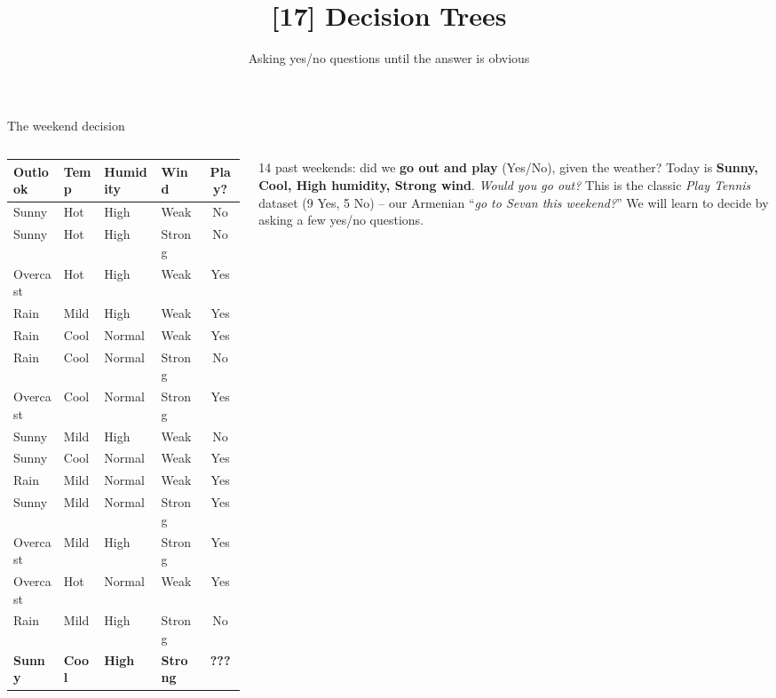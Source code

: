 \documentclass[aspectratio=169]{beamer}
\title{[17] Decision Trees}
\subtitle{Asking yes/no questions until the answer is obvious}
\date{}
\begin{document}
\begin{frame}{The weekend decision}
  \begin{columns}[T]
    \scriptsize
    \setlength{\tabcolsep}{4pt}\renewcommand{\arraystretch}{1.02}
    \begin{tabular}{l l l l | c}
      \textbf{Outlook} & \textbf{Temp} & \textbf{Humidity} & \textbf{Wind} & \textbf{Play?} \\
      \hline
      Sunny & Hot & High & Weak & \textcolor{armred}{No} \\
      Sunny & Hot & High & Strong & \textcolor{armred}{No} \\
      Overcast & Hot & High & Weak & \textcolor{paramgreen}{Yes} \\
      Rain & Mild & High & Weak & \textcolor{paramgreen}{Yes} \\
      Rain & Cool & Normal & Weak & \textcolor{paramgreen}{Yes} \\
      Rain & Cool & Normal & Strong & \textcolor{armred}{No} \\
      Overcast & Cool & Normal & Strong & \textcolor{paramgreen}{Yes} \\
      Sunny & Mild & High & Weak & \textcolor{armred}{No} \\
      Sunny & Cool & Normal & Weak & \textcolor{paramgreen}{Yes} \\
      Rain & Mild & Normal & Weak & \textcolor{paramgreen}{Yes} \\
      Sunny & Mild & Normal & Strong & \textcolor{paramgreen}{Yes} \\
      Overcast & Mild & High & Strong & \textcolor{paramgreen}{Yes} \\
      Overcast & Hot & Normal & Weak & \textcolor{paramgreen}{Yes} \\
      Rain & Mild & High & Strong & \textcolor{armred}{No} \\
      \hline
      \textbf{Sunny} & \textbf{Cool} & \textbf{High} & \textbf{Strong} & \textbf{???} \\
    \end{tabular}
    14 past weekends: did we \textbf{go out and play} (Yes/No), given the weather?
    \vskip 4pt
    Today is \textbf{Sunny, Cool, High humidity, Strong wind}.
    \vskip 4pt
    \emph{Would you go out?}
    \vskip 6pt
    \footnotesize This is the classic \emph{Play Tennis} dataset (9 Yes, 5 No) -- our
    Armenian ``\emph{go to Sevan this weekend?}'' We will learn to decide by asking a
    few yes/no questions.
  \end{columns}
\end{frame}
\end{document}
